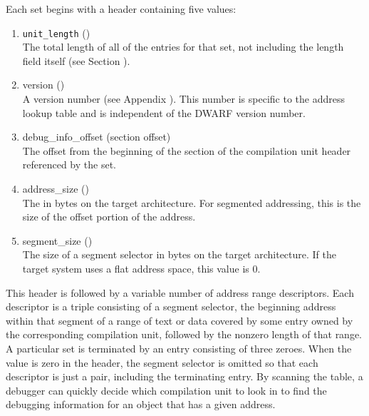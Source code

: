 Each set begins with a header containing five values:
\begin{enumerate}[1. ]
\item \texttt{unit\_length} () \\
The total length of all of the
entries for that set, not including the length field itself
(see Section ).

\item version () \\
A version number 
(see Appendix ). 
This number is specific to the address lookup table and is
independent of the DWARF version number.

\item debug\_info\_offset (section offset) \\
The offset from the
beginning of the \dotdebuginfo{} section of the
compilation unit header referenced by the set.

\item address\_size () \\
The 
in bytes on
the target architecture. For 
segmented addressing, this is
the size of the offset portion of the address.

\item segment\_size () \\
The size of a segment selector in
bytes on the target architecture. If the target system uses
a flat address space, this value is 0.

\end{enumerate}


This header is followed by a variable number of address range
descriptors. Each descriptor is a triple consisting of a
segment selector, the beginning address within that segment
of a range of text or data covered by some entry owned by
the corresponding compilation unit, followed by the non\dash zero
length of that range. A particular set is terminated by an
entry consisting of three zeroes. 
When the 
 value
is zero in the header, the segment selector is omitted so that
each descriptor is just a pair, including the terminating
entry. By scanning the table, a debugger can quickly decide
which compilation unit to look in to find the debugging
information for an object that has a given address.

